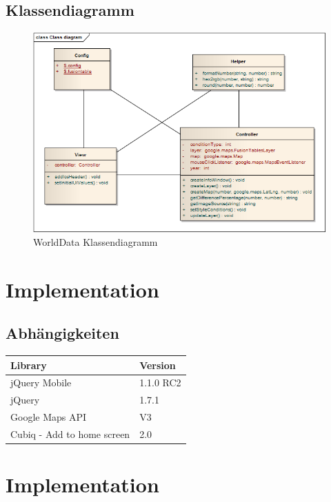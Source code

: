 \subsection{Klassendiagramm}
\begin{figure}[htbp]
	\centering
	\includegraphics[scale=0.7]{images/usecase1-worlddata/worlddata-classdiagram.png}
	\caption{WorldData Klassendiagramm}
	\label{worlddata-classdiagram}
\end{figure}

\section{Implementation}
\subsection{Abhängigkeiten}
\begin{tabular}{|l|l|}
\hline 
Library & Version \\ 
\hline 
jQuery Mobile & 1.1.0 RC2 \\ 
\hline 
jQuery & 1.7.1 \\ 
\hline 
Google Maps API & V3 \\ 
\hline 
Cubiq - Add to home screen & 2.0 \\ 
\hline 
\end{tabular} 

\section{Implementation}
